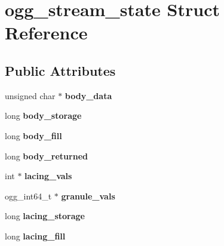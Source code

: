 \hypertarget{structogg__stream__state}{
\section{ogg\_\-stream\_\-state Struct Reference}
\label{structogg__stream__state}
}
\subsection*{Public Attributes}
\begin{DoxyCompactItemize}
\item 
\hypertarget{structogg__stream__state_a70d03b6f99c1d1e57f55e800b087dae8}{
unsigned char $\ast$ {\bfseries body\_\-data}}
\label{structogg__stream__state_a70d03b6f99c1d1e57f55e800b087dae8}

\item 
\hypertarget{structogg__stream__state_acc4cf19d7e31e1a6daab8f76fdb0afd6}{
long {\bfseries body\_\-storage}}
\label{structogg__stream__state_acc4cf19d7e31e1a6daab8f76fdb0afd6}

\item 
\hypertarget{structogg__stream__state_a19d45a7b5004f13ae02b5a9502354b93}{
long {\bfseries body\_\-fill}}
\label{structogg__stream__state_a19d45a7b5004f13ae02b5a9502354b93}

\item 
\hypertarget{structogg__stream__state_a602e02c9b0d5653eea5bd4f97bade116}{
long {\bfseries body\_\-returned}}
\label{structogg__stream__state_a602e02c9b0d5653eea5bd4f97bade116}

\item 
\hypertarget{structogg__stream__state_a55f3febfdfa9600b66fa2a990297813e}{
int $\ast$ {\bfseries lacing\_\-vals}}
\label{structogg__stream__state_a55f3febfdfa9600b66fa2a990297813e}

\item 
\hypertarget{structogg__stream__state_a5ddadad0bd4d5c5381b21da6f11a7d0c}{
ogg\_\-int64\_\-t $\ast$ {\bfseries granule\_\-vals}}
\label{structogg__stream__state_a5ddadad0bd4d5c5381b21da6f11a7d0c}

\item 
\hypertarget{structogg__stream__state_a23844488216514760bc66b38dfd6d4ae}{
long {\bfseries lacing\_\-storage}}
\label{structogg__stream__state_a23844488216514760bc66b38dfd6d4ae}

\item 
\hypertarget{structogg__stream__state_a6090ad58db768aa90218b0bc421d6f0e}{
long {\bfseries lacing\_\-fill}}
\label{structogg__stream__state_a6090ad58db768aa90218b0bc421d6f0e}


\end{DoxyCompactItemize}
